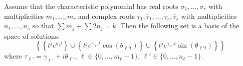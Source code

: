 \documentclass[12pt]{extarticle}
\begin{document}
\begin{theorem}{}{}
    Assume that the characteristic polynomial has real roots $\sigma_1, \dots, \sigma_r$ with multiplicities \newline $m_1,\dots,m_r$ and complex roots $\tau_1, \bar \tau_1, \dots, \tau_s, \bar \tau_s$ with multiplicities $n_1, \dots, n_s$ so that
    $\sum m_j + \sum 2n_j = k$.
    Then the following set is a basis of the space of solutions:
    \begin{equation}
        \left\{ \left\{ t^je^{\sigma_\ell t} \right\} \cup \left\{ t^je^{\gamma_{\ell'} t} \cos(\theta_{\ell' t}) \right\} \cup \left\{ t^je^{\gamma_{\ell'} t} \sin(\theta_{\ell' t}) \right\} \right\}
    \end{equation}
    where $\tau_{\ell'} =\gamma_{\ell'} + i \theta _{\ell'}$, $\ell \in \{0, \dots, m_\ell-1\}$, $\ell' \in \{ 0,\dots, n_\ell -1 \}$.
\end{theorem}

\end{document}
